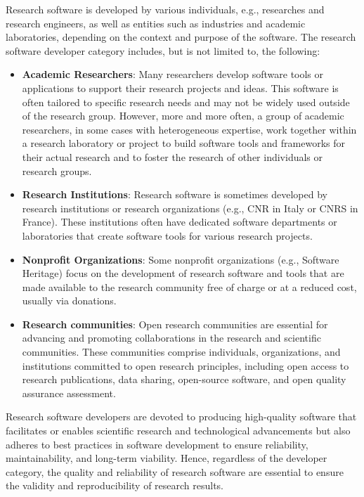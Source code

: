Research software is developed by various individuals, e.g., researches and research engineers, as well as entities such as industries and academic laboratories, depending on the context and purpose of the software. 
The research software developer category includes, but is not limited to, the following: 
\begin{itemize}
\item \textbf{Academic Researchers}: Many researchers develop software tools or applications to support their research projects and ideas. This software is often tailored to specific research needs and may not be widely used outside of the research group. However, more and more often, a group of academic researchers, in some cases with heterogeneous expertise, work together within a research laboratory or project to build software tools and frameworks for their actual research and to foster the research of other individuals or research groups.

\item \textbf{Research Institutions}: Research software is sometimes developed by research institutions or research organizations (e.g., CNR in Italy or CNRS in France). These institutions often have dedicated software departments or laboratories that create software tools for various research projects.

\item \textbf{Nonprofit Organizations}: Some nonprofit organizations (e.g., Software Heritage) focus on the development of research software and tools that are made available to the research community free of charge or at a reduced cost, usually via donations.

\item \textbf{Research communities}: Open research communities are essential for advancing and promoting collaborations in the research and scientific communities. These communities comprise individuals, organizations, and institutions committed to open research principles, including open access to research publications, data sharing, open-source software, and open quality assurance assessment. 
\end{itemize}


Research software developers are devoted to producing high-quality software that facilitates or enables scientific research and technological advancements but also adheres to best practices in software development to ensure reliability, maintainability, and long-term viability. Hence, regardless of the developer category, the quality and reliability of research software are essential to ensure the validity and reproducibility of research results.

